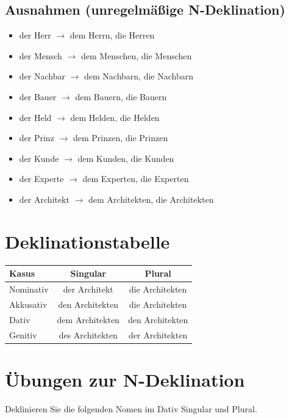 \subsection{Ausnahmen (unregelmäßige N-Deklination)}
\begin{itemize}
    \item der Herr $\rightarrow$ dem Herrn, die Herren
    \item der Mensch $\rightarrow$ dem Menschen, die Menschen
    \item der Nachbar $\rightarrow$ dem Nachbarn, die Nachbarn
    \item der Bauer $\rightarrow$ dem Bauern, die Bauern
    \item der Held $\rightarrow$ dem Helden, die Helden
    \item der Prinz $\rightarrow$ dem Prinzen, die Prinzen
    \item der Kunde $\rightarrow$ dem Kunden, die Kunden
    \item der Experte $\rightarrow$ dem Experten, die Experten
    \item der Architekt $\rightarrow$ dem Architekten, die Architekten
\end{itemize}

\section{Deklinationstabelle}
\label{sec:NDeklinationTabelle}

\begin{center}
\begin{tabular}{|l|c|c|}
\hline
\textbf{Kasus} & \textbf{Singular} & \textbf{Plural} \\ \hline
Nominativ & der Architekt & die Architekten \\ \hline
Akkusativ & den Architekten & die Architekten \\ \hline
Dativ & dem Architekten & den Architekten \\ \hline
Genitiv & des Architekten & der Architekten \\ \hline
\end{tabular}
\end{center}

\section{Übungen zur N-Deklination}
\label{sec:NDeklinationUebungen}

\begin{tcolorbox}[title={Aufgabe}]
Deklinieren Sie die folgenden Nomen im Dativ Singular und Plural.
\end{tcolorbox}


